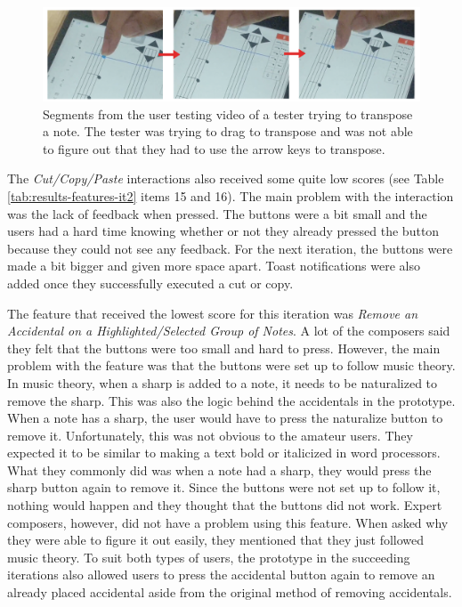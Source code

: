 				\begin{figure}[h]
					\centering
					\includegraphics[scale=0.34]{figures/video-transpose.png}
				    \caption{Segments from the user testing video of a tester trying to transpose a note. The tester was trying to drag to transpose and was not able to figure out that they had to use the arrow keys to transpose.}
				    \label{fig:video_transpose}
				\end{figure}

				The \textit{Cut/Copy/Paste} interactions also received some quite low scores (see Table \ref{tab:results-features-it2} items 15 and 16). The main problem with the interaction was the lack of feedback when pressed. The buttons were a bit small and the users had a hard time knowing whether or not they already pressed the button because they could not see any feedback. For the next iteration, the buttons were made a bit bigger and given more space apart. Toast notifications were also added once they successfully executed a cut or copy. 

				The feature that received the lowest score for this iteration was \textit{Remove an Accidental on a Highlighted/Selected Group of Notes}. A lot of the composers said they felt that the buttons were too small and hard to press. However, the main problem with the feature was that the buttons were set up to follow music theory. In music theory, when a sharp is added to a note, it needs to be naturalized to remove the sharp. This was also the logic behind the accidentals in the prototype. When a note has a sharp, the user would have to press the naturalize button to remove it. Unfortunately, this was not obvious to the amateur users. They expected it to be similar to making a text bold or italicized in word processors. What they commonly did was when a note had a sharp, they would press the sharp button again to remove it. Since the buttons were not set up to follow it, nothing would happen and they thought that the buttons did not work. Expert composers, however, did not have a problem using this feature. When asked why they were able to figure it out easily, they mentioned that they just followed music theory. To suit both types of users, the prototype in the succeeding iterations also allowed users to press the accidental button again to remove an already placed accidental aside from the original method of removing accidentals.

